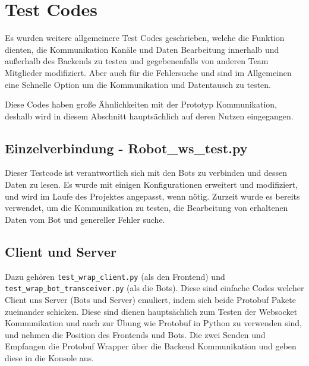 \section{Test Codes}
Es wurden weitere allgemeinere Test Codes geschrieben, 
welche die Funktion dienten, die Kommunikation Kanäle und Daten Bearbeitung innerhalb 
und außerhalb des Backends zu testen und gegebenenfalls von anderen Team Mitglieder modifiziert.
Aber auch für die Fehlersuche 
und sind im Allgemeinen eine Schnelle Option um die Kommunikation und Datentausch zu testen.

Diese Codes haben große Ähnlichkeiten mit der Prototyp Kommunikation, 
deshalb wird in diesem Abschnitt hauptsächlich auf deren Nutzen eingegangen.

\subsection{Einzelverbindung - Robot\_ws\_test.py}
Dieser Testcode ist verantwortlich sich mit den Bots zu verbinden und dessen Daten zu lesen.
Es wurde mit einigen Konfigurationen erweitert und modifiziert, 
und wird im Laufe des Projektes angepasst, wenn nötig.
Zurzeit wurde es bereits verwendet, um die Kommunikation zu testen, 
die Bearbeitung von erhaltenen Daten vom Bot und genereller Fehler suche.

\subsection{Client und Server}
Dazu gehören \texttt{test\_wrap\_client.py} (als den Frontend) 
und \texttt{test\_wrap\_bot\_transceiver.py} (als die Bots).
Diese sind einfache Codes welcher Client uns Server (Bots und Server) emuliert, 
indem sich beide Protobuf Pakete zueinander schicken. 
Diese sind dienen hauptsächlich zum Testen der Websocket Kommunikation 
und auch zur Übung wie Protobuf in Python zu verwenden sind, 
und nehmen die Position des Frontends und Bots.
Die zwei Senden und Empfangen die Protobuf Wrapper über die Backend Kommunikation 
und geben diese in die Konsole aus.
